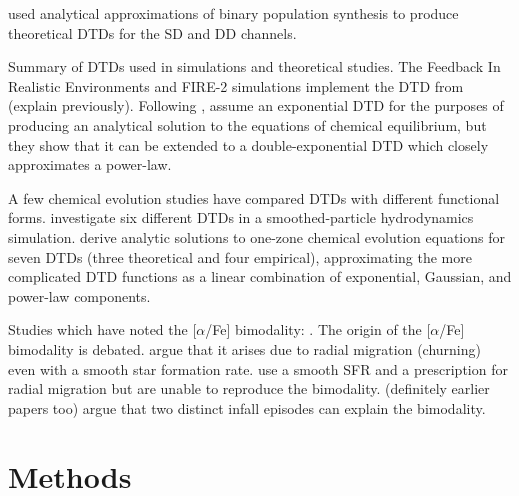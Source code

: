 \documentclass[modern,linenumbers]{aastex631}
\begin{document}
\citet{Greggio2005-AnalyticalRates} used analytical approximations of binary population synthesis to produce theoretical DTDs for the SD and DD channels.

Summary of DTDs used in simulations and theoretical studies. The Feedback In Realistic Environments \citep[FIRE;][]{Hopkins2014-FIRE-1} and FIRE-2 \citep{Hopkins2018-FIRE-2} simulations implement the DTD from \citet{Mannucci2006-TwoPopulations} (explain previously). Following \citet{Schonrich2009-RadialMixing}, \citet{Weinberg2017-ChemicalEquilibrium} assume an exponential DTD for the purposes of producing an analytical solution to the equations of chemical equilibrium, but they show that it can be extended to a double-exponential DTD which closely approximates a power-law. 

A few chemical evolution studies have compared DTDs with different functional forms. \citet{Poulhazan2018-PrecisionPollution} investigate six different DTDs in a smoothed-particle hydrodynamics simulation. \citet{Palicio2023-AnalyticDTD} derive analytic solutions to one-zone chemical evolution equations for seven DTDs (three theoretical and four empirical), approximating the more complicated DTD functions as a linear combination of exponential, Gaussian, and power-law components.

Studies which have noted the [$\alpha$/Fe] bimodality: \citet{Furhmann1998-NearbyStars,Hayden2015-ChemicalCartography}. The origin of the [$\alpha$/Fe] bimodality is debated. \citet{Schonrich2009-RadialMixing} argue that it arises due to radial migration (churning) even with a smooth star formation rate. \citet{Johnson2021-Migration} use a smooth SFR and a prescription for radial migration but are unable to reproduce the bimodality. \citet{Spitoni2021-TwoInfall} (definitely earlier papers too) argue that two distinct infall episodes can explain the bimodality.

\section{Methods}
\label{sec:methods}
\end{document}
